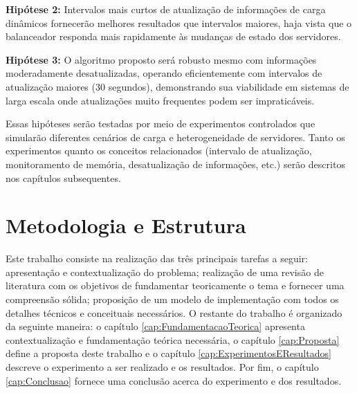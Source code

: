 \textbf{Hipótese 2:} Intervalos mais curtos de atualização de informações de carga dinâmicos fornecerão melhores resultados que intervalos maiores, haja vista que o balanceador responda mais rapidamente às mudanças de estado dos servidores.

\textbf{Hipótese 3:} O algoritmo proposto será robusto mesmo com informações moderadamente desatualizadas, operando eficientemente com intervalos de atualização maiores (30 segundos), demonstrando sua viabilidade em sistemas de larga escala onde atualizações muito frequentes podem ser impraticáveis.

Essas hipóteses serão testadas por meio de experimentos controlados que simularão diferentes cenários de carga e heterogeneidade de servidores. Tanto os experimentos quanto os conceitos relacionados (intervalo de atualização, monitoramento de memória, desatualização de informações, etc.) serão descritos nos capítulos subsequentes.

\section{Metodologia e Estrutura}

Este trabalho consiste na realização das três principais tarefas a seguir: apresentação e contextualização do problema; realização de uma revisão de literatura com os objetivos de fundamentar teoricamente o tema e fornecer uma compreensão sólida; proposição de um modelo de implementação com todos os detalhes técnicos e conceituais necessários. O restante do trabalho é organizado da seguinte maneira: o capítulo \ref{cap:FundamentacaoTeorica} apresenta contextualização e fundamentação teórica necessária, o capítulo \ref{cap:Proposta} define a proposta deste trabalho e o capítulo \ref{cap:ExperimentosEResultados} descreve o experimento a ser realizado e os resultados. Por fim, o capítulo \ref{cap:Conclusao} fornece uma conclusão acerca do experimento e dos resultados.
